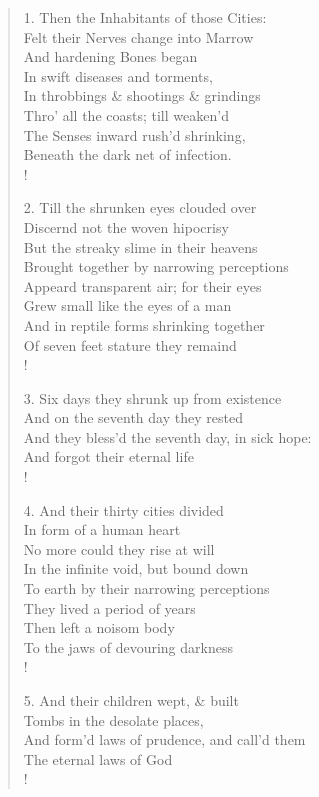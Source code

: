 \documentclass[9pt]{extarticle}
\begin{document}
\begin{verse}
\begin{altverse} 
		
		1. Then the Inhabitants of those Cities:\\
		Felt their Nerves change into Marrow\\
		And hardening Bones began\\
		In swift diseases and torments,\\
		In throbbings \& shootings \& grindings\\
		Thro' all the coasts; till weaken'd\\
		The Senses inward rush'd shrinking,\\
		Beneath the dark net of infection.\\!
		
		2. Till the shrunken eyes clouded over\\
		Discernd not the woven hipocrisy\\
		But the streaky slime in their heavens\\
		Brought together by narrowing perceptions\\
		Appeard transparent air; for their eyes\\
		Grew small like the eyes of a man\\
		And in reptile forms shrinking together\\
		Of seven feet stature they remaind\\!
		
		3. Six days they shrunk up from existence\\
		And on the seventh day they rested\\
		And they bless'd the seventh day, in sick hope:\\
		And forgot their eternal life\\!
		
		4. And their thirty cities divided\\
		In form of a human heart\\
		No more could they rise at will\\
		In the infinite void, but bound down\\
		To earth by their narrowing perceptions\\
		They lived a period of years\\
		Then left a noisom body\\
		To the jaws of devouring darkness\\!
		
		5. And their children wept, \& built\\
		Tombs in the desolate places,\\
		And form'd laws of prudence, and call'd them\\
		The eternal laws of God\\!
		

\end{altverse}
\end{verse}
\end{document}
